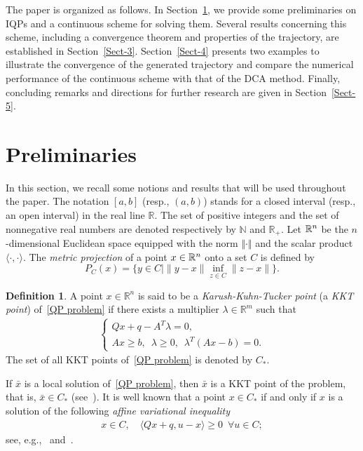 \documentclass[11pt]{article}
\theoremstyle{definition}
\newtheorem{definition}{Definition}
\theoremstyle{remark}
\def\R{\Bbb R}
\begin{document}
The paper is organized as follows. In Section~\ref{Sect-2}, we provide some preliminaries on IQPs and a continuous scheme for solving them. Several results concerning this scheme, including a convergence theorem and properties of the trajectory, are established in Section~\ref{Sect-3}. Section~\ref{Sect-4} presents two examples to illustrate the convergence of the generated trajectory and compare the numerical performance of the continuous scheme with that of the DCA method. Finally, concluding remarks and directions for further research are given in Section~\ref{Sect-5}.
\section{Preliminaries}\label{Sect-2}

In this section, we recall some notions and results that will be used throughout the paper. The notation $[a,b]$ (resp., $(a,b)$) stands for a closed interval (resp., an open interval) in the real line $\mathbb{R}$. The set of positive integers and the set of nonnegative real numbers are denoted respectively by $\mathbb{N}$  and $\mathbb{R}_+$. Let $\R^n$ be the $n$-dimensional Euclidean space equipped with the norm $ \Vert \cdot \Vert $ and the scalar product~$\langle \cdot,\cdot \rangle$. The \textit{metric projection} of a point $x\in \R^n$ onto a set $C$ is defined by $$P_C(x) = \big\{y\in C \mid \|y-x\| \inf_{z\in C}\|z-x\|\big\}.$$ 

\begin{definition} {\rm A point $x\in\mathbb R^n$ is said to be a {\it Karush-Kuhn-Tucker point} (a {\it KKT point}) of~\eqref{QP problem} if there exists a multiplier $\lambda\in\mathbb R^m$  such that
		\begin{eqnarray}\label{KKT_Point_Set}
			\begin{cases}Qx+q-A^T\lambda=0,\\ Ax\geq b,\ \; \lambda\geq 0,\ \; \lambda^T(Ax-b)=0.\end{cases}
		\end{eqnarray} 
		The set of all KKT points of~\eqref{QP problem} is denoted by $C_*$.
} \end{definition}

If $\bar x$ is a local solution of~\eqref{QP problem}, then $\bar x$ is a KKT point of the problem, that is, $\bar x\in C_*$ (see~\cite[Theorem~3.3]{lty05}). It is well known that a point $x\in C_*$ if and only if $x$ is a solution of the following \textit{affine variational inequality}
\begin{eqnarray}\label{AVI} x\in C,\quad \langle Qx+q,u-x\rangle\geq 0\ \; \forall u\in C;
	\end{eqnarray}
	see, e.g.,~\cite[Theorem~5.3]{lty05} and~\cite{lty2012}.
	
\end{document}
